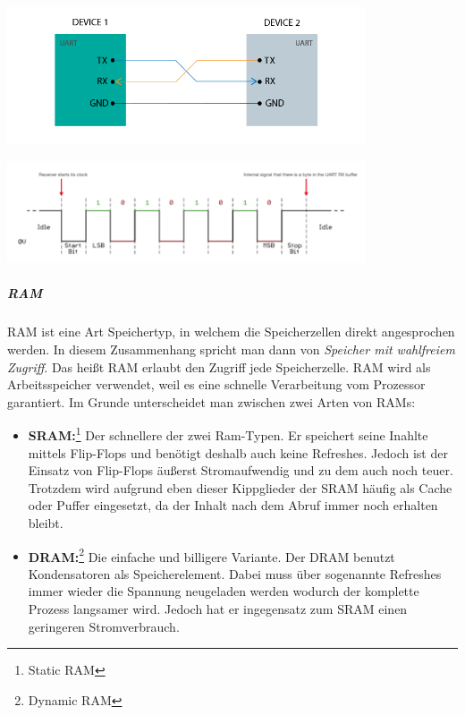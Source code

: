 \documentclass[
    headings=optiontotocandhead,%
    twoside,
    numbers=noenddot,%
    12pt, %
    titlepage, %
    parskip=full, %
    listof=leveldown, 
    numbers=noenddot, %
    a4paper,DIV=14,
    BCOR=15mm,
]{scrbook}
\let\origfigure=\figure
\let\endorigfigure=\endfigure
\renewenvironment{figure}[1][]{%
   \origfigure[H]
}{%
   \endorigfigure
}
\providecommand{\tightlist}{%
  \setlength{\itemsep}{0pt}\setlength{\parskip}{0pt}}
\begin{document}
\begin{itemize}
  \begin{figure}
  \centering
  \includegraphics[width=4.16667in,height=\textheight]{img/Kampl/UART-Grafik.png}
  \caption{UART-Grafik {[}\protect\hyperlink{ref-UART-Grafik}{6}{]}}
  \end{figure}

  \begin{figure}
  \centering
  \includegraphics[width=4.16667in,height=\textheight]{img/Kampl/UART-TimerDiagramm.png}
  \caption{UART-Timerdiagramm
  {[}\protect\hyperlink{ref-Serielle-Schnittstellen}{3}{]}}
  \end{figure}
\end{itemize}

\hypertarget{ram}{%
\subparagraph{RAM}\label{ram}}

RAM ist eine Art Speichertyp, in welchem die Speicherzellen direkt
angesprochen werden. In diesem Zusammenhang spricht man dann von
\emph{Speicher mit wahlfreiem Zugriff}. Das heißt RAM erlaubt den
Zugriff jede Speicherzelle. RAM wird als Arbeitsspeicher verwendet, weil
es eine schnelle Verarbeitung vom Prozessor garantiert. Im Grunde
unterscheidet man zwischen zwei Arten von RAMs:

\begin{itemize}
\tightlist
\item
  \textbf{SRAM:}\footnote{Static RAM} Der schnellere der zwei Ram-Typen.
  Er speichert seine Inahlte mittels Flip-Flops und benötigt deshalb
  auch keine Refreshes. Jedoch ist der Einsatz von Flip-Flops äußerst
  Stromaufwendig und zu dem auch noch teuer. Trotzdem wird aufgrund eben
  dieser Kippglieder der SRAM häufig als Cache oder Puffer eingesetzt,
  da der Inhalt nach dem Abruf immer noch erhalten bleibt.
\item
  \textbf{DRAM:}\footnote{Dynamic RAM} Die einfache und billigere
  Variante. Der DRAM benutzt Kondensatoren als Speicherelement. Dabei
  muss über sogenannte Refreshes immer wieder die Spannung neugeladen
  werden wodurch der komplette Prozess langsamer wird. Jedoch hat er
  ingegensatz zum SRAM einen geringeren Stromverbrauch.
\end{itemize}
\end{document}
